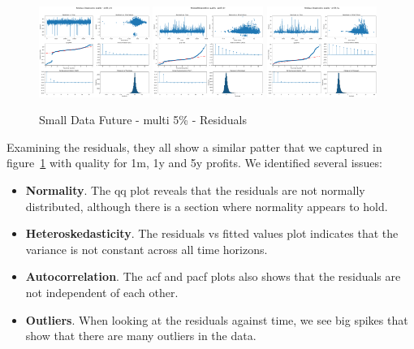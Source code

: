 \documentclass[11pt,english,a4paper,hidelinks]{book}
\begin{document}
\begin{figure}[H]
    \centering
    \includegraphics[width=0.32\textwidth]{images/code/models/linear_regression/first_model/Multi/quality_profit_1m_residuals.png}
    \includegraphics[width=0.32\textwidth]{images/code/models/linear_regression/first_model/Multi/quality_profit_1y_residuals.png}
    \includegraphics[width=0.32\textwidth]{images/code/models/linear_regression/first_model/Multi/quality_profit_5y_residuals.png}
    \caption{Small Data Future - \acrshort{multi} 5\% - Residuals}
    \label{fig:first_linear_regression_residuals}
\end{figure}

\noindent Examining the residuals, they all show a similar patter that we captured in figure~\ref{fig:first_linear_regression_residuals} with quality for 1m, 1y and 5y profits. We identified several issues:

\begin{itemize}
    \item \textbf{Normality}. The \acrshort{qq} plot reveals that the residuals are not normally distributed, although there is a section where normality appears to hold.
    \item \textbf{Heteroskedasticity}. The residuals vs fitted values plot indicates that the variance is not constant across all time horizons.
    \item \textbf{Autocorrelation}. The \acrshort{acf} and \acrshort{pacf} plots also shows that the residuals are not independent of each other.
    \item \textbf{Outliers}. When looking at the residuals against time, we see big spikes that show that there are many outliers in the data.
\end{itemize}
\end{document}
